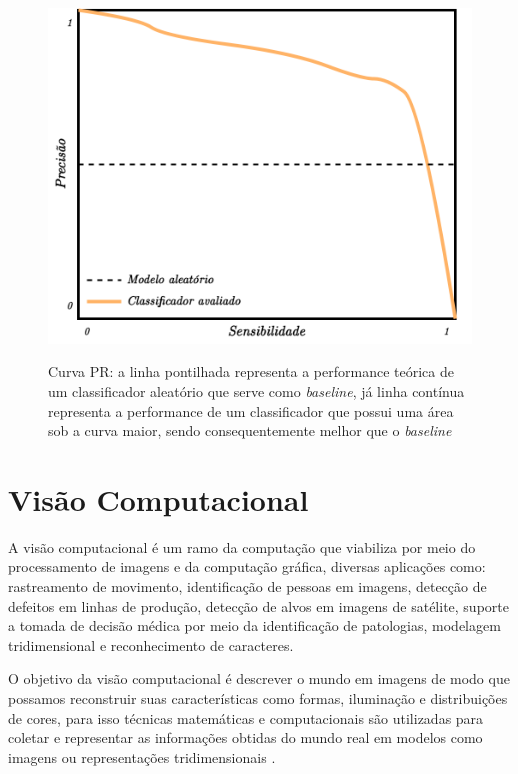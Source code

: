\begin{figure}[htbp]
	\centering
	\caption[Curva PR]{Curva PR: a linha pontilhada representa a performance teórica de um classificador aleatório que serve como \textit{baseline}, já linha contínua representa a performance de um classificador que possui uma área sob a curva maior, sendo consequentemente melhor que o \textit{baseline}}
		\includegraphics[scale=.20]{imagens/prcurve.png}
	\label{fig:prcurve}
\end{figure}



\section{Visão Computacional}

A visão computacional é um ramo da computação que viabiliza por meio do processamento de imagens e da computação gráfica, diversas aplicações como: rastreamento de movimento, identificação de pessoas em imagens, detecção de defeitos em linhas de produção, detecção de alvos em imagens de satélite, suporte a tomada de decisão médica por meio da identificação de patologias, modelagem tridimensional e reconhecimento de caracteres. 

O objetivo da visão computacional é descrever o mundo em imagens de modo que possamos reconstruir suas características como formas, iluminação e distribuições de cores, para isso técnicas matemáticas e computacionais são utilizadas para coletar e representar as informações obtidas do mundo real em modelos como imagens ou representações tridimensionais \cite{szeliskiComputerVisionAlgorithms2011}.

